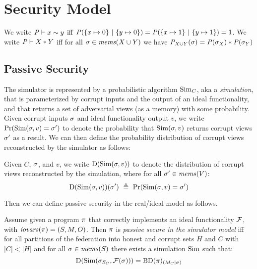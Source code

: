 \section{Security Model}

\begin{definition}
  We write $\mathit{P} \vdash x \sim y$ iff $\mathit{P}(\{ x \mapsto 0\}\ |\ \{ y \mapsto 0 \}) =
  \mathit{P}(\{ x \mapsto 1\}\ |\ \{ y \mapsto 1 \}) = 1$.
  We write $\mathit{P} \vdash X * Y$ iff for all
    $\sigma \in \mathit{mems}(X \cup Y)$ we have
  ${\mathit{P}}_{X \cup Y}(\sigma) =
  \mathit{P}(\sigma_X) * \mathit{P}(\sigma_Y)$
\end{definition}

\subsection{Passive Security}

The simulator is represented by a probabilistic algorithm $\mathrm{Sim}_C$,
aka a \emph{simulation}, that is parameterized by corrupt inputs and
the output of an ideal functionality, and that returns a set of
adversarial views (as a memory) with some probability. Given
corrupt inputs $\sigma$ and ideal functionality output $v$,  
we write
$
\mathrm{Pr}(\mathrm{Sim}(\sigma,v) = \sigma')
$
to denote the probability that $\mathrm{Sim}(\sigma,v)$
returns corrupt views $\sigma'$ as a result. We can then define the
probability distribution of corrupt views reconstructed
by the simulator as follows:
\begin{definition}
  Given $C$, $\sigma$, and $v$, we write $\mathrm{D}(\mathrm{Sim}(\sigma,v))$ to
  denote the distribution of corrupt views reconstructed by the
  simulation, where for
  all $\sigma' \in \mathit{mems}(V)$:
  $$
  \dist(\SIM(\store,v))(\store')\ \defeq\ \prob(\SIM(\store,v) = \store') 
  $$
\end{definition}

Then we can define passive security in the real/ideal
model as follows. 
\begin{definition}
  Assume given a program $\pi$ that correctly implements an ideal
  functionality $\mathcal{F}$, with $\mathit{iovars}(\pi) = (S,M,O)$.  Then $\pi$
  is \emph{passive secure in the simulator model} iff for all
  partitions of the federation into honest and corrupt sets $H$ and $C$
  with $|C| < |H|$ and for all $\sigma \in \mathit{mems}(S)$ there exists a
  simulation $\mathrm{Sim}$ such that:
  $$
  \mathrm{D}(\mathrm{Sim}(\sigma_{S_C},\mathcal{F}(\sigma))) = \mathrm{BD}(\pi)_{({M_C}|{\sigma})}
  $$
\end{definition}

